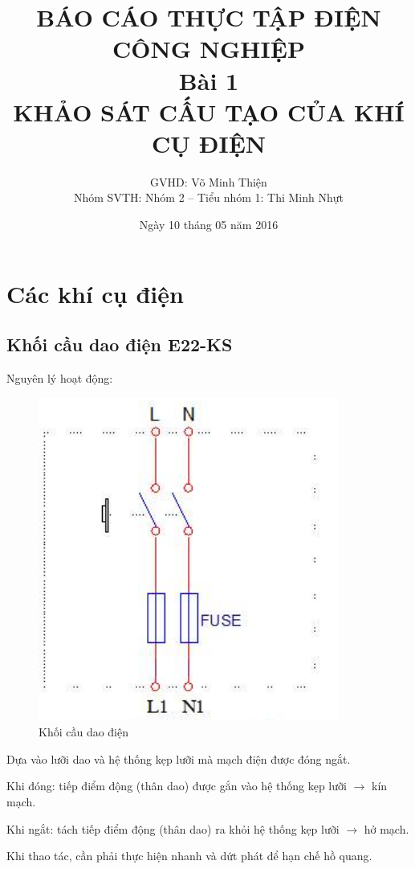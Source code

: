 \documentclass[13pt,a4paper]{extarticle}
\begin{document}
\title{\Large{\textbf{BÁO CÁO THỰC TẬP ĐIỆN CÔNG NGHIỆP}}\\\vspace{1cm}\textbf{Bài 1}\\\vspace{.5cm}\textbf{KHẢO SÁT CẤU TẠO CỦA KHÍ CỤ ĐIỆN}}
\date{Ngày 10 tháng 05 năm 2016}
\author{GVHD: Võ Minh Thiện \vspace{.6cm}\\  Nhóm SVTH: Nhóm 2 -- Tiểu nhóm 1: Thi Minh Nhựt}
\maketitle
\tableofcontents
\newpage
{}
\setcounter{page}{1}
\section{Các khí cụ điện}
\subsection{Khối cầu dao điện E22-KS}
Nguyên lý hoạt động:
\begin{figure}[!h]
\begin{center}
\includegraphics[scale=.5]{cau-dao-dien}
\end{center}
\caption{Khối cầu dao điện}
\end{figure}
\begin{list}{--}{}
\item Dựa vào lưỡi dao và hệ thống kẹp lưỡi mà mạch điện được đóng ngắt.
\item Khi đóng: tiếp điểm động (thân dao) được gắn vào hệ thống kẹp lưỡi $\longrightarrow$ kín mạch.
\item Khi ngắt: tách tiếp điểm động (thân dao) ra khỏi hệ thống kẹp lưỡi $\longrightarrow$ hở mạch.
\item Khi thao tác, cần phải thực hiện nhanh và dứt phát để hạn chế hồ quang.
\end{list}
\end{document}
